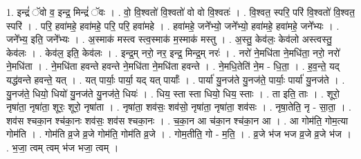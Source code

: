\documentclass[17pt]{extarticle}
\begin{document}
1. इन्द्रं॑ ॅवो व॒ इन्द्र॒ मिन्द्रं॑ ॅवः । . वो॒ वि॒श्वतो॑ वि॒श्वतो॑ वो वो वि॒श्वतः॑ । . वि॒श्वत॒ स्परि॒ परि॑ वि॒श्वतो॑ वि॒श्वत॒ स्परि॑ । . परि॒ हवा॑महे॒ हवा॑महे॒ परि॒ परि॒ हवा॑महे । . हवा॑महे॒ जने᳚भ्यो॒ जने᳚भ्यो॒ हवा॑महे॒ हवा॑महे॒ जने᳚भ्यः । . जने᳚भ्य॒ इति॒ जने᳚भ्यः । . अ॒स्माक॑ मस्त्व स्त्व॒स्माक॑ म॒स्माक॑ मस्तु । . अ॒स्तु॒ केव॑लः॒ केव॑लो अस्त्वस्तु॒ केव॑लः । . केव॑ल॒ इति॒ केव॑लः । . इन्द्र॒म् नरो॒ नर॒ इन्द्र॒ मिन्द्र॒म् नरः॑ । . नरो॑ ने॒मधि॑ता ने॒मधि॑ता॒ नरो॒ नरो॑ ने॒मधि॑ता । . ने॒मधि॑ता हवन्ते हवन्ते ने॒मधि॑ता ने॒मधि॑ता हवन्ते । . ने॒मधि॒तेति॑ ने॒म - धि॒ता॒ । . ह॒व॒न्ते॒ यद् यद्ध॑वन्ते हवन्ते॒ यत् । . यत् पार्याः॒ पार्या॒ यद् यत् पार्याः᳚ । . पार्या॑ यु॒नज॑ते यु॒नज॑ते॒ पार्याः॒ पार्या॑ यु॒नज॑ते । . यु॒नज॑ते॒ धियो॒ धियो॑ यु॒नज॑ते यु॒नज॑ते॒ धियः॑ । . धिय॒ स्ता स्ता धियो॒ धिय॒ स्ताः । . ता इति॒ ताः । . शूरो॒ नृषा॑ता॒ नृषा॑ता॒ शूरः॒ शूरो॒ नृषा॑ता । . नृषा॑ता॒ शव॑सः॒ शव॑सो॒ नृषा॑ता॒ नृषा॑ता॒ शव॑सः । . नृषा॒तेति॒ नृ - सा॒ता॒ । . शव॑स श्चका॒न श्च॑का॒नः शव॑सः॒ शव॑स श्चका॒नः । . च॒का॒न आ च॑का॒न श्च॑का॒न आ । . आ गोम॑ति॒ गोम॒त्या गोम॑ति । . गोम॑ति व्र॒जे व्र॒जे गोम॑ति॒ गोम॑ति व्र॒जे । . गोम॒तीति॒ गो - म॒ति॒ । . व्र॒जे भ॑ज भज व्र॒जे व्र॒जे भ॑ज । . भ॒जा॒ त्वम् त्वम् भ॑ज भजा॒ त्वम् । \newline
\end{document}
